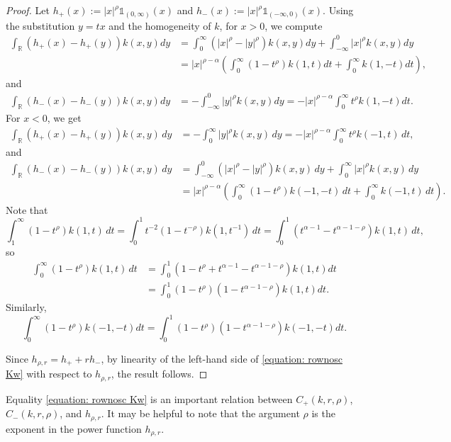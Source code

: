 \documentclass[12pt, a4paper]{amsart}
\newcommand{\R}{\mathbb{R}}
\begin{document}
\begin{proof}
Let  $h_+(x) := |x|^{\rho}\mathds{1}_{(0, \infty)}(x)$ and $h_-(x) := |x|^{\rho}\mathds{1}_{(-\infty, 0)}(x)$. Using the substitution $y = tx$ and the homogeneity of $k$, for $x > 0$, we compute
\begin{align*}
    \int_{\R}(h_+(x) - h_+(y))k(x, y)dy 
    &= \int_{0}^{\infty}(|x|^\rho - |y|^\rho)k(x, y)dy + \int_{-\infty}^{0}|x|^\rho k(x, y)dy \\
    &= |x|^{\rho-\alpha} \left( \int_{0}^{\infty}(1 - t^\rho)k(1, t)dt + \int_{0}^{\infty}k(1, -t)dt \right),
\end{align*}
and
\begin{align*}    
    \int_{\R}(h_-(x) - h_-(y))k(x, y)dy 
    &= -\int_{-\infty}^{0}|y|^\rho k(x, y)dy 
    = -|x|^{\rho - \alpha} \int_{0}^{\infty}t^\rho k(1, -t)dt.
\end{align*}
For $x < 0$, we get
\begin{align*}
    \int_{\R}(h_+(x) - h_+(y))k(x, y)\,dy 
    &= -\int_{0}^{\infty}|y|^\rho k(x, y)\,dy 
    = -|x|^{\rho - \alpha} \int_{0}^{\infty}t^\rho k(-1, t)\,dt,
\end{align*}
and
\begin{align*}
    \int_{\R}(h_-(x) - h_-(y))k(x, y)\,dy 
    &= \int_{-\infty}^{0}(|x|^\rho - |y|^\rho)k(x, y)\,dy + \int_{0}^{\infty}|x|^\rho k(x, y)\,dy \\
    &= |x|^{\rho-\alpha} \left( \int_{0}^{\infty}(1 - t^\rho)k(-1, -t)\,dt + \int_{0}^{\infty}k(-1, t)\,dt \right).
\end{align*}
Note that
\[
\int_{1}^{\infty}(1 - t^\rho)k(1, t)\,dt 
= \int_{0}^{1}t^{-2}(1 - t^{-\rho})k(1, t^{-1})\,dt 
= \int_{0}^{1}(t^{\alpha - 1} - t^{\alpha - 1- \rho})k(1, t)\,dt,
\]
so 
\begin{align*}
\int_{0}^{\infty}(1 - t^\rho)k(1, t)\,dt 
&= \int_{0}^{1}(1 - t^\rho + t^{\alpha - 1} - t^{\alpha - 1- \rho})k(1, t)dt \\
&= \int_{0}^{1}(1 - t^\rho)(1 - t^{\alpha - 1- \rho})k(1, t)dt.
\end{align*}
Similarly,
\[
\int_{0}^{\infty}(1 - t^\rho)k(-1, -t)dt = \int_{0}^{1}(1 - t^\rho)(1 - t^{\alpha - 1- \rho})k(-1, -t)dt.
\]

Since $h_{\rho, r} = h_+ + rh_-$, by linearity of the left-hand side of \eqref{equation: rownosc Kw} with respect to $h_{\rho, r}$, the result follows.
\end{proof}

Equality \cref{equation: rownosc Kw} is an important relation between $C_+(k, r, \rho)$, $C_-(k, r, \rho)$, and $h_{\rho, r}$. It may be helpful to note that the argument $\rho$ is the exponent in the power function $h_{\rho, r}$. 
\end{document}
